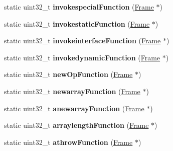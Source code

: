 \begin{DoxyCompactItemize}
\item 
static uint32\+\_\+t {\bfseries invokespecial\+Function} (\hyperlink{classFrame}{Frame} $\ast$)\hypertarget{classInstruction_a43a7098a7089e05c4bd01d66950660cf}{}\label{classInstruction_a43a7098a7089e05c4bd01d66950660cf}

\item 
static uint32\+\_\+t {\bfseries invokestatic\+Function} (\hyperlink{classFrame}{Frame} $\ast$)\hypertarget{classInstruction_a035cfd59de6c55da6731b98ade78cc2b}{}\label{classInstruction_a035cfd59de6c55da6731b98ade78cc2b}

\item 
static uint32\+\_\+t {\bfseries invokeinterface\+Function} (\hyperlink{classFrame}{Frame} $\ast$)\hypertarget{classInstruction_a00daa048e6f2455ad777fb0513a30a49}{}\label{classInstruction_a00daa048e6f2455ad777fb0513a30a49}

\item 
static uint32\+\_\+t {\bfseries invokedynamic\+Function} (\hyperlink{classFrame}{Frame} $\ast$)\hypertarget{classInstruction_a95003e85efc9e68e044ad9b4ec4b0035}{}\label{classInstruction_a95003e85efc9e68e044ad9b4ec4b0035}

\item 
static uint32\+\_\+t {\bfseries new\+Op\+Function} (\hyperlink{classFrame}{Frame} $\ast$)\hypertarget{classInstruction_accf1fd2bfb787838319b73524f6b1671}{}\label{classInstruction_accf1fd2bfb787838319b73524f6b1671}

\item 
static uint32\+\_\+t {\bfseries newarray\+Function} (\hyperlink{classFrame}{Frame} $\ast$)\hypertarget{classInstruction_a5cd103fbdc629a053ce58c6d3eca841a}{}\label{classInstruction_a5cd103fbdc629a053ce58c6d3eca841a}

\item 
static uint32\+\_\+t {\bfseries anewarray\+Function} (\hyperlink{classFrame}{Frame} $\ast$)\hypertarget{classInstruction_ac58ca3d9b7ebc43f9c1b41ca4ee5d703}{}\label{classInstruction_ac58ca3d9b7ebc43f9c1b41ca4ee5d703}

\item 
static uint32\+\_\+t {\bfseries arraylength\+Function} (\hyperlink{classFrame}{Frame} $\ast$)\hypertarget{classInstruction_af12f15ccb221607daf01fec783064b22}{}\label{classInstruction_af12f15ccb221607daf01fec783064b22}

\item 
static uint32\+\_\+t {\bfseries athrow\+Function} (\hyperlink{classFrame}{Frame} $\ast$)\hypertarget{classInstruction_aefc08a2090c1c726c28190c79f2ca52c}{}\label{classInstruction_aefc08a2090c1c726c28190c79f2ca52c}


\end{DoxyCompactItemize}
